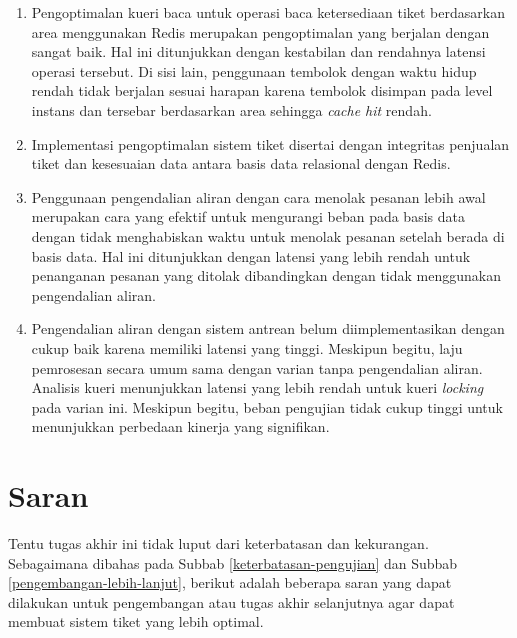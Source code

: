\begin{enumerate}
    \item Pengoptimalan kueri baca untuk operasi baca ketersediaan tiket berdasarkan area menggunakan Redis merupakan pengoptimalan yang berjalan dengan sangat baik. Hal ini ditunjukkan dengan kestabilan dan rendahnya latensi operasi tersebut. Di sisi lain, penggunaan tembolok dengan waktu hidup rendah tidak berjalan sesuai harapan karena tembolok disimpan pada level instans dan tersebar berdasarkan area sehingga \textit{cache hit} rendah.
    \item Implementasi pengoptimalan sistem tiket disertai dengan integritas penjualan tiket dan kesesuaian data antara basis data relasional dengan Redis.
    \item Penggunaan pengendalian aliran dengan cara menolak pesanan lebih awal merupakan cara yang efektif untuk mengurangi beban pada basis data dengan tidak menghabiskan waktu untuk menolak pesanan setelah berada di basis data. Hal ini ditunjukkan dengan latensi yang lebih rendah untuk penanganan pesanan yang ditolak dibandingkan dengan tidak menggunakan pengendalian aliran.
    \item Pengendalian aliran dengan sistem antrean belum diimplementasikan dengan cukup baik karena memiliki latensi yang tinggi. Meskipun begitu, laju pemrosesan secara umum sama dengan varian tanpa pengendalian aliran. Analisis kueri menunjukkan latensi yang lebih rendah untuk kueri \textit{locking} pada varian ini. Meskipun begitu, beban pengujian tidak cukup tinggi untuk menunjukkan perbedaan kinerja yang signifikan.
\end{enumerate}

\pagebreak

\section{Saran}

Tentu tugas akhir ini tidak luput dari keterbatasan dan kekurangan. Sebagaimana dibahas pada Subbab \ref{keterbatasan-pengujian} dan Subbab \ref{pengembangan-lebih-lanjut}, berikut adalah beberapa saran yang dapat dilakukan untuk pengembangan atau tugas akhir selanjutnya agar dapat membuat sistem tiket yang lebih optimal.

